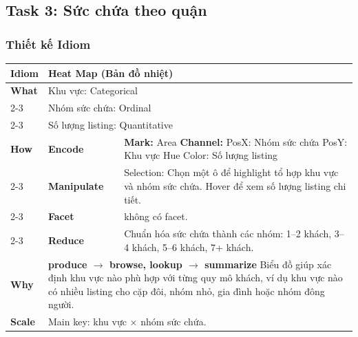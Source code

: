 \subsection{Task 3: Sức chứa theo quận}

\subsubsection{Thiết kế Idiom}

\begin{table}[H]
\centering
\renewcommand{\arraystretch}{1.1}
\begin{tabularx}{\textwidth}{|l|l|X|}
\hline
\textbf{Idiom} & \multicolumn{2}{l|}{\textbf{Heat Map (Bản đồ nhiệt)}} \\ \hline
\textbf{What}
& \multicolumn{2}{X|}{Khu vực: Categorical} \\ \cline{2-3}
& \multicolumn{2}{X|}{Nhóm sức chứa: Ordinal} \\ \cline{2-3}
& \multicolumn{2}{X|}{Số lượng listing: Quantitative} \\ \hline
\textbf{How}
& \textbf{Encode} &
\textbf{Mark:} Area \newline
\textbf{Channel:} \newline
\hspace*{1em} PosX: Nhóm sức chứa \newline
\hspace*{1em} PosY: Khu vực \newline
\hspace*{1em} Hue Color: Số lượng listing \\ \cline{2-3}
& \textbf{Manipulate} &
Selection: Chọn một ô để highlight tổ hợp khu vực và nhóm sức chứa. \newline
Hover để xem số lượng listing chi tiết. \\ \cline{2-3}
& \textbf{Facet} &
không có facet. \\ \cline{2-3}
& \textbf{Reduce} &
Chuẩn hóa sức chứa thành các nhóm: 1--2 khách, 3--4 khách, 5--6 khách, 7+ khách. \\ \hline
\textbf{Why} & \multicolumn{2}{X|}{
\textbf{produce $\rightarrow$ browse, lookup $\rightarrow$ summarize} \newline
Biểu đồ giúp xác định khu vực nào phù hợp với từng quy mô khách, ví dụ khu vực nào có nhiều listing cho cặp đôi, nhóm nhỏ, gia đình hoặc nhóm đông người.
} \\ \hline
\textbf{Scale} & \multicolumn{2}{X|}{
Main key: khu vực $\times$ nhóm sức chứa.
} \\ \hline
\end{tabularx}
\end{table}

